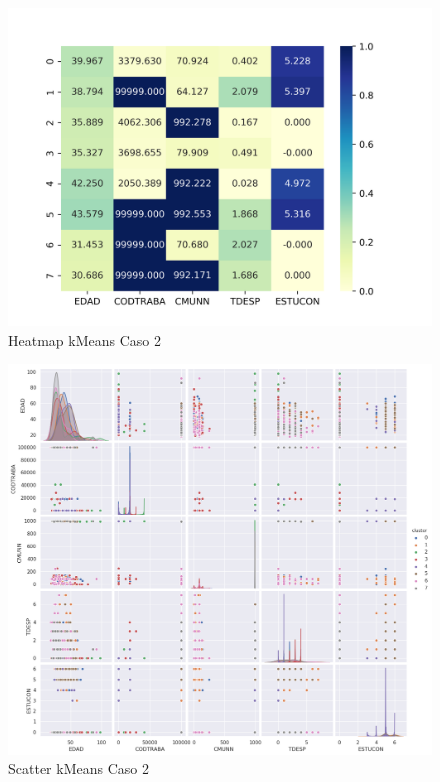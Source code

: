 \begin{figure}[H] %
	\centering
	\includegraphics[scale=0.8]{heatmap-km-2.png}  %
	\caption{Heatmap kMeans Caso 2} 
	\label{fig:hm-km-caso2}
\end{figure}

\begin{figure}[H] %
	\centering
	\includegraphics[scale=0.4]{kmeans-2.png}  %
	\caption{Scatter kMeans Caso 2} 
	\label{fig:sc-km-caso2}
\end{figure}




